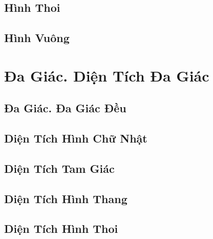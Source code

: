 \documentclass{article}
\numberwithin{equation}{section}
\begin{document}
\subsection{Hình Thoi}


\subsection{Hình Vuông}


\section{Đa Giác. Diện Tích Đa Giác}

\subsection{Đa Giác. Đa Giác Đều}


\subsection{Diện Tích Hình Chữ Nhật}


\subsection{Diện Tích Tam Giác}


\subsection{Diện Tích Hình Thang}


\subsection{Diện Tích Hình Thoi}

\end{document}
